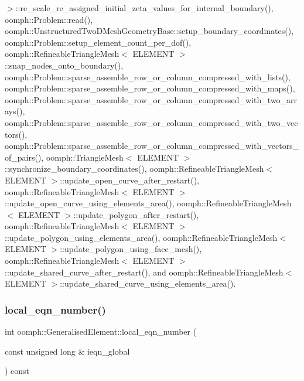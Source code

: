 $>$\+::re\+\_\+scale\+\_\+re\+\_\+assigned\+\_\+initial\+\_\+zeta\+\_\+values\+\_\+for\+\_\+internal\+\_\+boundary(), oomph\+::\+Problem\+::read(), oomph\+::\+Unstructured\+Two\+D\+Mesh\+Geometry\+Base\+::setup\+\_\+boundary\+\_\+coordinates(), oomph\+::\+Problem\+::setup\+\_\+element\+\_\+count\+\_\+per\+\_\+dof(), oomph\+::\+Refineable\+Triangle\+Mesh$<$ E\+L\+E\+M\+E\+N\+T $>$\+::snap\+\_\+nodes\+\_\+onto\+\_\+boundary(), oomph\+::\+Problem\+::sparse\+\_\+assemble\+\_\+row\+\_\+or\+\_\+column\+\_\+compressed\+\_\+with\+\_\+lists(), oomph\+::\+Problem\+::sparse\+\_\+assemble\+\_\+row\+\_\+or\+\_\+column\+\_\+compressed\+\_\+with\+\_\+maps(), oomph\+::\+Problem\+::sparse\+\_\+assemble\+\_\+row\+\_\+or\+\_\+column\+\_\+compressed\+\_\+with\+\_\+two\+\_\+arrays(), oomph\+::\+Problem\+::sparse\+\_\+assemble\+\_\+row\+\_\+or\+\_\+column\+\_\+compressed\+\_\+with\+\_\+two\+\_\+vectors(), oomph\+::\+Problem\+::sparse\+\_\+assemble\+\_\+row\+\_\+or\+\_\+column\+\_\+compressed\+\_\+with\+\_\+vectors\+\_\+of\+\_\+pairs(), oomph\+::\+Triangle\+Mesh$<$ E\+L\+E\+M\+E\+N\+T $>$\+::synchronize\+\_\+boundary\+\_\+coordinates(), oomph\+::\+Refineable\+Triangle\+Mesh$<$ E\+L\+E\+M\+E\+N\+T $>$\+::update\+\_\+open\+\_\+curve\+\_\+after\+\_\+restart(), oomph\+::\+Refineable\+Triangle\+Mesh$<$ E\+L\+E\+M\+E\+N\+T $>$\+::update\+\_\+open\+\_\+curve\+\_\+using\+\_\+elements\+\_\+area(), oomph\+::\+Refineable\+Triangle\+Mesh$<$ E\+L\+E\+M\+E\+N\+T $>$\+::update\+\_\+polygon\+\_\+after\+\_\+restart(), oomph\+::\+Refineable\+Triangle\+Mesh$<$ E\+L\+E\+M\+E\+N\+T $>$\+::update\+\_\+polygon\+\_\+using\+\_\+elements\+\_\+area(), oomph\+::\+Refineable\+Triangle\+Mesh$<$ E\+L\+E\+M\+E\+N\+T $>$\+::update\+\_\+polygon\+\_\+using\+\_\+face\+\_\+mesh(), oomph\+::\+Refineable\+Triangle\+Mesh$<$ E\+L\+E\+M\+E\+N\+T $>$\+::update\+\_\+shared\+\_\+curve\+\_\+after\+\_\+restart(), and oomph\+::\+Refineable\+Triangle\+Mesh$<$ E\+L\+E\+M\+E\+N\+T $>$\+::update\+\_\+shared\+\_\+curve\+\_\+using\+\_\+elements\+\_\+area().

\mbox{\label{classoomph_1_1GeneralisedElement_a3d46b71d27f94aeba21aff1ef84fd0a6}} 
\subsubsection{\texorpdfstring{local\+\_\+eqn\+\_\+number()}{local\_eqn\_number()}}
{\footnotesize\ttfamily int oomph\+::\+Generalised\+Element\+::local\+\_\+eqn\+\_\+number (\begin{DoxyParamCaption}\item[{const unsigned long \&}]{ieqn\+\_\+global }\end{DoxyParamCaption}) const\hspace{0.3cm}{\ttfamily [inline]}}



